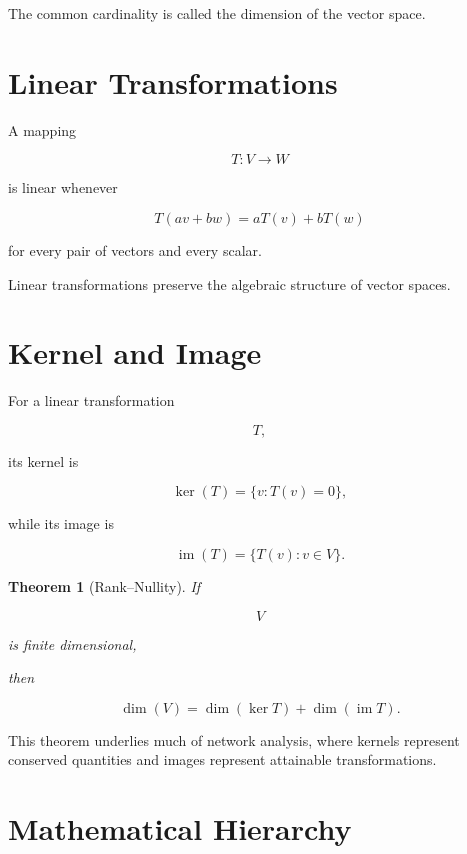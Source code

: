 \documentclass[11pt,fleqn]{book}
\numberwithin{equation}{chapter}
\theoremstyle{plain}
\newtheorem{theorem}{Theorem}[chapter]
\theoremstyle{definition}
\theoremstyle{remark}
\begin{document}
The common cardinality is called the dimension of the vector space.


\section{Linear Transformations}

A mapping

\[
T:V\rightarrow W
\]

is linear whenever

\[
T(av+bw)
=
aT(v)+bT(w)
\]

for every pair of vectors and every scalar.

Linear transformations preserve the algebraic structure of vector
spaces.


\section{Kernel and Image}

For a linear transformation

\[
T,
\]

its kernel is

\[
\ker(T)
=
\{v:T(v)=0\},
\]

while its image is

\[
\operatorname{im}(T)
=
\{T(v):v\in V\}.
\]


\begin{theorem}[Rank--Nullity]

If

\[
V
\]

is finite dimensional,

then

\[
\dim(V)
=
\dim(\ker T)
+
\dim(\operatorname{im}T).
\]

\end{theorem}

This theorem underlies much of network analysis, where kernels represent
conserved quantities and images represent attainable transformations.


\section{Mathematical Hierarchy}
\end{document}
